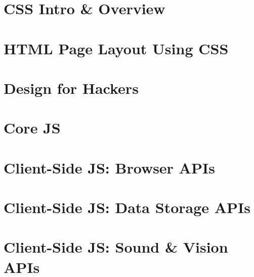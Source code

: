 \documentclass[12pt, a4paper, oneside]{book}
\begin{document}
\chapter{CSS Intro \& Overview}
\label{css}
\paragraph{} 

\chapter{HTML Page Layout Using CSS}
\label{layout}
\paragraph{} 

\chapter{Design for Hackers}
\label{design}
\paragraph{} 

\chapter{Core JS}
\label{core-js}
\paragraph{} 

\chapter{Client-Side JS: Browser APIs}
\label{browser-apis}
\paragraph{} 

\chapter{Client-Side JS: Data Storage APIs}
\label{data-storage}
\paragraph{} 

\chapter{Client-Side JS: Sound \& Vision APIs}
\label{sound-and-vision}
\end{document}
